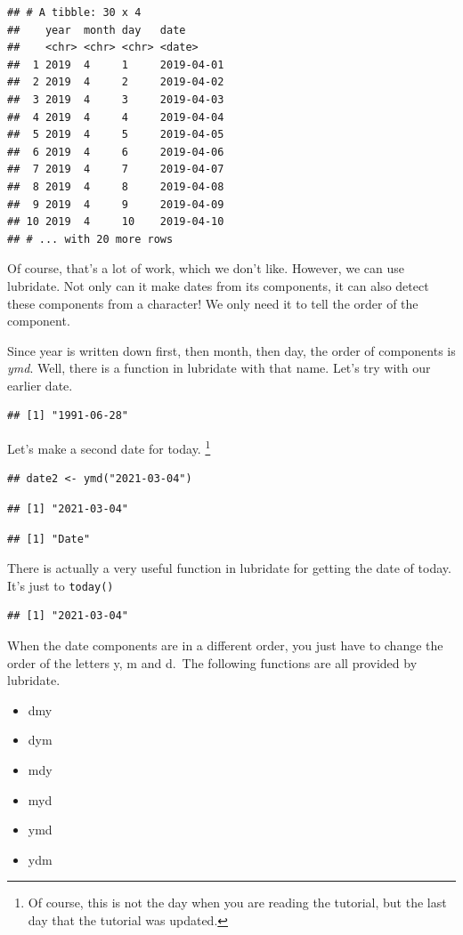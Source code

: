 \documentclass[]{tufte-book}
\providecommand{\tightlist}{%
  \setlength{\itemsep}{0pt}\setlength{\parskip}{0pt}}
\begin{document}
\begin{verbatim}
## # A tibble: 30 x 4
##    year  month day   date      
##    <chr> <chr> <chr> <date>    
##  1 2019  4     1     2019-04-01
##  2 2019  4     2     2019-04-02
##  3 2019  4     3     2019-04-03
##  4 2019  4     4     2019-04-04
##  5 2019  4     5     2019-04-05
##  6 2019  4     6     2019-04-06
##  7 2019  4     7     2019-04-07
##  8 2019  4     8     2019-04-08
##  9 2019  4     9     2019-04-09
## 10 2019  4     10    2019-04-10
## # ... with 20 more rows
\end{verbatim}

Of course, that's a lot of work, which we don't like. However, we can use lubridate. Not only can it make dates from its components, it can also detect these components from a character! We only need it to tell the order of the component.

Since year is written down first, then month, then day, the order of components is \emph{ymd}. Well, there is a function in lubridate with that name. Let's try with our earlier date.

\begin{verbatim}
## [1] "1991-06-28"
\end{verbatim}

Let's make a second date for today. \footnote{Of course, this is not the day when you are reading the tutorial, but the last day that the tutorial was updated.}

\begin{verbatim}
## date2 <- ymd("2021-03-04")
\end{verbatim}

\begin{verbatim}
## [1] "2021-03-04"
\end{verbatim}

\begin{verbatim}
## [1] "Date"
\end{verbatim}

There is actually a very useful function in lubridate for getting the date of today. It's just to \texttt{today()}

\begin{verbatim}
## [1] "2021-03-04"
\end{verbatim}

When the date components are in a different order, you just have to change the order of the letters y, m and d.~The following functions are all provided by lubridate.

\begin{itemize}
\tightlist
\item
  dmy
\item
  dym
\item
  mdy
\item
  myd
\item
  ymd
\item
  ydm
\end{itemize}
\end{document}
